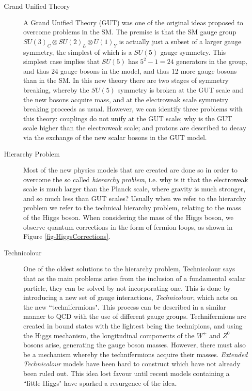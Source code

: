 \begin{description}
	\item[Grand Unified Theory] A Grand Unified Theory (GUT) was one of the original ideas proposed to overcome problems in the SM. The premise is that the SM gauge group $SU(3)_C \otimes SU(2)_L \otimes U(1)_Y$ is actually just a subset of a larger gauge symmetry, the simplest of which is a $SU(5)$ gauge symmetry. This simplest case implies that $SU(5)$ has $5^2 - 1 = 24$ generators in the group, and thus 24 gauge bosons in the model, and thus 12 more gauge bosons than in the SM. In this new theory there are two stages of symmetry breaking, whereby the $SU(5)$ symmetry is broken at the GUT scale and the new bosons acquire mass, and at the electroweak scale symmetry breaking proceeds as usual. However, we can identify three problems with this theory: couplings do not unify at the GUT scale; why is the GUT scale higher than the electroweak scale; and protons are described to decay via the exchange of the new scalar bosons in the GUT model.
	\item[Hierarchy Problem] Most of the new physics models that are created are done so in order to overcome the so called \emph{hierarchy problem}, i.e. why is it that the electroweak scale is much larger than the Planck scale, where gravity is much stronger, and so much less than GUT scales? Usually when we refer to the hierarchy problem we refer to the technical hierarchy problem, relating to the mass of the Higgs boson. When considering the mass of the Higgs boson, we observe quantum corrections in the form of fermion loops, as shown in Figure \ref{fig-HiggsCorrections}. 
	\item[Technicolour] One of the oldest solutions to the hierarchy problem, Technicolour says that as the main problems arise from the inclusion of a fundamental scalar particle, they can be solved by not incorporating one. This is done by introducing a new set of gauge interactions, \emph{Technicolour}, which acts on the new ``technifermions". This process can be described in a similar manner to QCD with the use of different gauge groups. Technifermions are created in bound states with the lightest being the technipions, and using the Higgs mechanism, the longitudinal components of the $W^{\pm}$ and $Z^0$ bosons arise, generating the gauge boson masses. However, there must also be a mechanism whereby the technifermions acquire their masses. \emph{Extended Technicolour} models have been hard to construct which have not already been ruled out. This idea lost favour until recent models containing a ``little Higgs" have sparked a resurgence of the idea.

\end{description}
